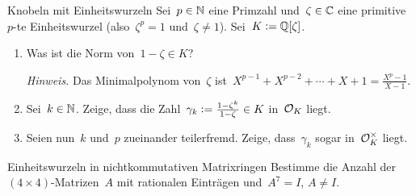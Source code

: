 \documentclass{uebblatt}
\begin{document}
\begin{aufgabe}{Knobeln mit Einheitswurzeln}
Sei~$p \in \mathbb{N}$ eine Primzahl und~$\zeta \in \mathbb{C}$ eine primitive~$p$-te
Einheitswurzel (also~$\zeta^p = 1$ und~$\zeta \neq 1$). Sei~$K \vcentcolon=
\mathbb{Q}[\zeta]$.
\begin{enumerate}
\item Was ist die Norm von~$1 - \zeta \in K$?
{\tiny\emph{Hinweis.} Das Minimalpolynom von~$\zeta$ ist~$X^{p-1} + X^{p-2} +
\cdots + X + 1 = \tfrac{X^p - 1}{X-1}$.\par}
\item Sei~$k \in \mathbb{N}$. Zeige, dass die Zahl~$\gamma_k \vcentcolon=
\tfrac{1-\zeta^k}{1-\zeta} \in K$ in~$\mathcal{O}_K$ liegt.
\item Seien nun~$k$ und~$p$ zueinander teilerfremd. Zeige, dass~$\gamma_k$
sogar in~$\mathcal{O}_K^\times$ liegt.
\end{enumerate}
\end{aufgabe}

\begin{aufgabe*}{Einheitswurzeln in nichtkommutativen Matrixringen}
Bestimme die Anzahl der~$(4\times4)$-Matrizen~$A$ mit rationalen Einträgen
und~$A^7 = I$, $A \neq I$.
\end{aufgabe*}
\end{document}
